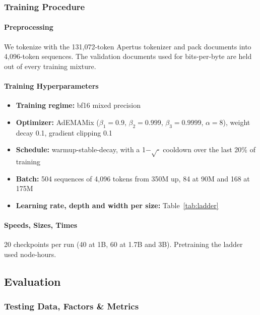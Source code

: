 \subsubsection*{Training Procedure}

\paragraph{Preprocessing}

We tokenize with the 131,072-token Apertus tokenizer and pack documents into 4,096-token sequences. The validation documents used for bits-per-byte are held out of every training mixture.

\paragraph{Training Hyperparameters}

\begin{itemize}
    \item \textbf{Training regime:} bf16 mixed precision
    \item \textbf{Optimizer:} AdEMAMix ($\beta_1 = 0.9$, $\beta_2 = 0.999$, $\beta_3 = 0.9999$, $\alpha = 8$), weight decay 0.1, gradient clipping 0.1
    \item \textbf{Schedule:} warmup-stable-decay, with a 1$-\sqrt{\cdot}$ cooldown over the last 20\% of training
    \item \textbf{Batch:} 504 sequences of 4,096 tokens from 350M up, 84 at 90M and 168 at 175M
    \item \textbf{Learning rate, depth and width per size:} Table~\ref{tab:ladder}
\end{itemize}

\paragraph{Speeds, Sizes, Times}

20 checkpoints per run (40 at 1B, 60 at 1.7B and 3B). Pretraining the ladder used \npretrainnodehours node-hours.

\subsection*{Evaluation}

\subsubsection*{Testing Data, Factors \& Metrics}

